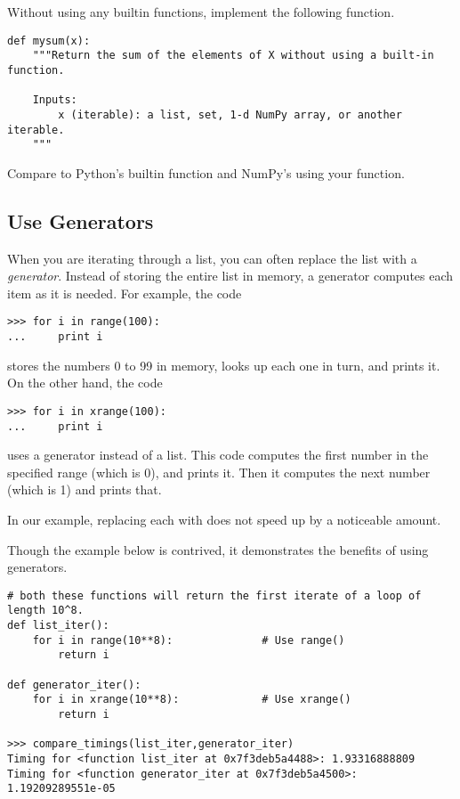 \begin{problem}
Without using any builtin functions, implement the following function.

\begin{lstlisting}
def mysum(x):
    """Return the sum of the elements of X without using a built-in function.

    Inputs:
        x (iterable): a list, set, 1-d NumPy array, or another iterable.
    """
\end{lstlisting}

Compare  to Python's builtin  function and NumPy's  using your  function.
\label{prob:add}
\end{problem}

\subsection*{Use Generators} %

When you are iterating through a list, you can often replace the list with a \emph{generator}.
Instead of storing the entire list in memory, a generator computes each item as it is needed.
For example, the code

\begin{lstlisting}
>>> for i in range(100):
...     print i
\end{lstlisting}
%
stores the numbers 0 to 99 in memory, looks up each one in turn, and prints it.
On the other hand, the code

\begin{lstlisting}
>>> for i in xrange(100):
...     print i
\end{lstlisting}
%
uses a generator instead of a list.
This code computes the first number in the specified range (which is 0), and prints it.
Then it computes the next number (which is 1) and prints that.

In our example, replacing each  with  does not speed up  by a noticeable amount.

Though the example below is contrived, it demonstrates the benefits of using generators.

\begin{lstlisting}
# both these functions will return the first iterate of a loop of length 10^8.
def list_iter():
    for i in range(10**8):              # Use range()
        return i

def generator_iter():
    for i in xrange(10**8):             # Use xrange()
        return i

>>> compare_timings(list_iter,generator_iter)
Timing for <function list_iter at 0x7f3deb5a4488>: 1.93316888809
Timing for <function generator_iter at 0x7f3deb5a4500>: 1.19209289551e-05
\end{lstlisting}


